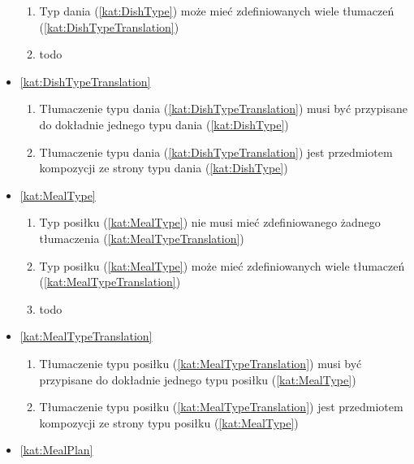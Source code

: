 \begin{itemize}[label={\textbf{Reguły dla}}, wide, labelwidth=!, labelindent=0pt]
\begin{enumerate}[label={\textbf{REG/\protect\threedigits{\arabic{enumi}}}}, wide, labelwidth=!, align=left, leftmargin=3cm, resume]
        \item Typ dania (\ref{kat:DishType}) może mieć zdefiniowanych wiele tłumaczeń (\ref{kat:DishTypeTranslation})
        \item todo
    \end{enumerate}
    \item\ref{kat:DishTypeTranslation}
    \begin{enumerate}[label={\textbf{REG/\protect\threedigits{\arabic{enumi}}}}, wide, labelwidth=!, align=left, leftmargin=3cm, resume]
        \item Tłumaczenie typu dania (\ref{kat:DishTypeTranslation}) musi być przypisane do dokładnie jednego typu dania (\ref{kat:DishType})
        \item Tłumaczenie typu dania (\ref{kat:DishTypeTranslation}) jest przedmiotem kompozycji ze strony typu dania (\ref{kat:DishType})
    \end{enumerate}
    \item\ref{kat:MealType}
    \begin{enumerate}[label={\textbf{REG/\protect\threedigits{\arabic{enumi}}}}, wide, labelwidth=!, align=left, leftmargin=3cm, resume]
        \item Typ posiłku (\ref{kat:MealType}) nie musi mieć zdefiniowanego żadnego tłumaczenia (\ref{kat:MealTypeTranslation})
        \item Typ posiłku (\ref{kat:MealType}) może mieć zdefiniowanych wiele tłumaczeń (\ref{kat:MealTypeTranslation})
        \item todo
    \end{enumerate}
    \item\ref{kat:MealTypeTranslation}
    \begin{enumerate}[label={\textbf{REG/\protect\threedigits{\arabic{enumi}}}}, wide, labelwidth=!, align=left, leftmargin=3cm, resume]
        \item Tłumaczenie typu posiłku (\ref{kat:MealTypeTranslation}) musi być przypisane do dokładnie jednego typu posiłku (\ref{kat:MealType})
        \item Tłumaczenie typu posiłku (\ref{kat:MealTypeTranslation}) jest przedmiotem kompozycji ze strony typu posiłku (\ref{kat:MealType})
    \end{enumerate}
    \item\ref{kat:MealPlan}
    \begin{enumerate}[label={\textbf{REG/\protect\threedigits{\arabic{enumi}}}}, wide, labelwidth=!, align=left, leftmargin=3cm, resume]

\end{enumerate}
\end{itemize}
